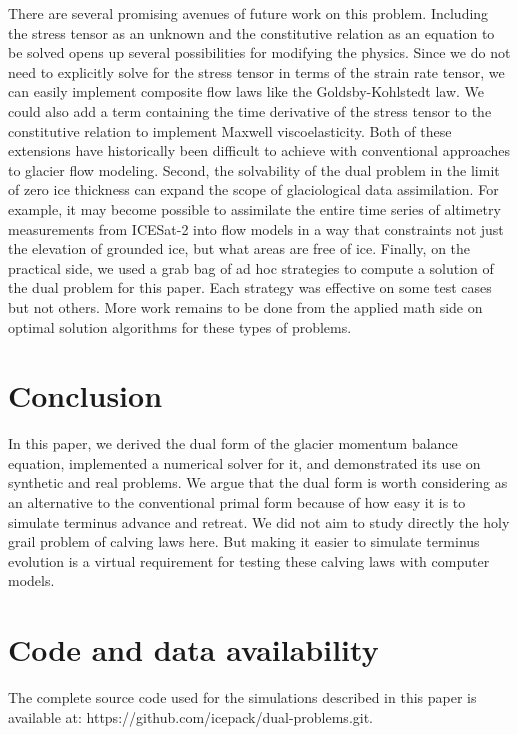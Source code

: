\documentclass[review,oneside]{igs}
\begin{document}
There are several promising avenues of future work on this problem.
Including the stress tensor as an unknown and the constitutive relation as an equation to be solved opens up several possibilities for modifying the physics.
Since we do not need to explicitly solve for the stress tensor in terms of the strain rate tensor, we can easily implement composite flow laws like the Goldsby-Kohlstedt law.
We could also add a term containing the time derivative of the stress tensor to the constitutive relation to implement Maxwell viscoelasticity.
Both of these extensions have historically been difficult to achieve with conventional approaches to glacier flow modeling.
Second, the solvability of the dual problem in the limit of zero ice thickness can expand the scope of glaciological data assimilation.
For example, it may become possible to assimilate the entire time series of altimetry measurements from ICESat-2 into flow models in a way that constraints not just the elevation of grounded ice, but what areas are free of ice.
Finally, on the practical side, we used a grab bag of ad hoc strategies to compute a solution of the dual problem for this paper.
Each strategy was effective on some test cases but not others.
More work remains to be done from the applied math side on optimal solution algorithms for these types of problems.


\section{Conclusion}

In this paper, we derived the dual form of the glacier momentum balance equation, implemented a numerical solver for it, and demonstrated its use on synthetic and real problems.
We argue that the dual form is worth considering as an alternative to the conventional primal form because of how easy it is to simulate terminus advance and retreat.
We did not aim to study directly the holy grail problem of calving laws here.
But making it easier to simulate terminus evolution is a virtual requirement for testing these calving laws with computer models.



\section{Code and data availability}

The complete source code used for the simulations described in this paper is available at: https://github.com/icepack/dual-problems.git.
\end{document}
